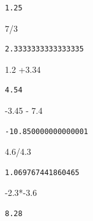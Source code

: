 \documentclass[
  11pt,
  a4paper,
  DIV=11,
  numbers=noendperiod]{scrartcl}
\newenvironment{Shaded}{\begin{snugshade}}{\end{snugshade}}
\newcommand{\DecValTok}[1]{\textcolor[rgb]{0.68,0.00,0.00}{#1}}
\newcommand{\FloatTok}[1]{\textcolor[rgb]{0.68,0.00,0.00}{#1}}
\newcommand{\OperatorTok}[1]{\textcolor[rgb]{0.37,0.37,0.37}{#1}}
\begin{document}
\begin{verbatim}
1.25
\end{verbatim}

\begin{Shaded}
\begin{Highlighting}[numbers=left,,]
\DecValTok{7}\OperatorTok{/}\DecValTok{3}
\end{Highlighting}
\end{Shaded}

\begin{verbatim}
2.3333333333333335
\end{verbatim}

\begin{Shaded}
\begin{Highlighting}[numbers=left,,]
\FloatTok{1.2} \OperatorTok{+}\FloatTok{3.34}
\end{Highlighting}
\end{Shaded}

\begin{verbatim}
4.54
\end{verbatim}

\begin{Shaded}
\begin{Highlighting}[numbers=left,,]
\OperatorTok{{-}}\FloatTok{3.45} \OperatorTok{{-}} \FloatTok{7.4}
\end{Highlighting}
\end{Shaded}

\begin{verbatim}
-10.850000000000001
\end{verbatim}

\begin{Shaded}
\begin{Highlighting}[numbers=left,,]
\FloatTok{4.6}\OperatorTok{/}\FloatTok{4.3}
\end{Highlighting}
\end{Shaded}

\begin{verbatim}
1.069767441860465
\end{verbatim}

\begin{Shaded}
\begin{Highlighting}[numbers=left,,]
\OperatorTok{{-}}\FloatTok{2.3}\OperatorTok{*{-}}\FloatTok{3.6}
\end{Highlighting}
\end{Shaded}

\begin{verbatim}
8.28
\end{verbatim}
\end{document}
